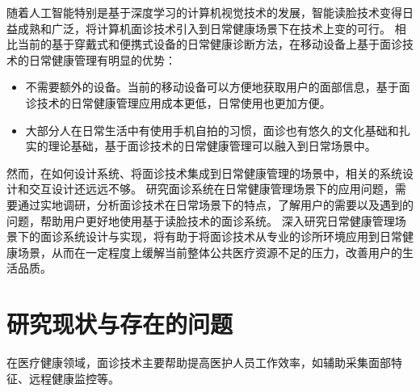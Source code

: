 

随着人工智能特别是基于深度学习的计算机视觉技术的发展，智能读脸技术变得日益成熟和广泛，将计算机面诊技术引入到日常健康场景下在技术上变的可行。
相比当前的基于穿戴式和便携式设备的日常健康诊断方法，在移动设备上基于面诊技术的日常健康管理有明显的优势：

\begin{itemize}
    \item 不需要额外的设备。当前的移动设备可以方便地获取用户的面部信息，基于面诊技术的日常健康管理应用成本更低，日常使用也更加方便。
    
    \item 大部分人在日常生活中有使用手机自拍的习惯，面诊也有悠久的文化基础和扎实的理论基础，基于面诊技术的日常健康管理可以融入到日常场景中。
\end{itemize}

然而，在如何设计系统、将面诊技术集成到日常健康管理的场景中，相关的系统设计和交互设计还远远不够。
研究面诊系统在日常健康管理场景下的应用问题，需要通过实地调研，分析面诊技术在日常场景下的特点，了解用户的需要以及遇到的问题，帮助用户更好地使用基于读脸技术的面诊系统。
深入研究日常健康管理场景下的面诊系统设计与实现，将有助于将面诊技术从专业的诊所环境应用到日常健康场景，从而在一定程度上缓解当前整体公共医疗资源不足的压力，改善用户的生活品质。

\section{研究现状与存在的问题}


在医疗健康领域，面诊技术主要帮助提高医护人员工作效率，如辅助采集面部特征\cite{张红凯2015中医面诊信息采集与识别方法研究进展}、远程健康监控\cite{Hossain2015Cloud}等。

